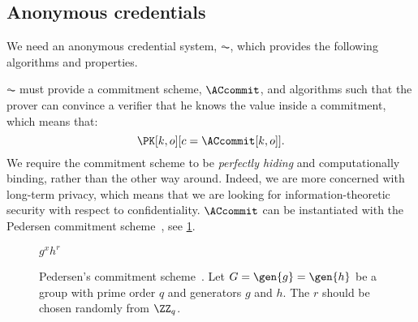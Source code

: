 \subsection{Anonymous credentials}%
\label{ZK-anon-cred}


We need an anonymous credential system, \(\AC\), which provides the following algorithms and properties.

\(\AC\) must provide a commitment scheme, \(\ACcommit\), and algorithms such that the prover can convince a verifier that he knows the value inside a commitment, which means that:
\begin{equation*}
  \PK[k, o][c = \ACcommit[k,o]].
\end{equation*}
We require the commitment scheme to be \emph{perfectly hiding} and computationally binding, rather than the other way around.
Indeed, we are more concerned with long-term privacy, which means that we are looking for information-theoretic security with respect to confidentiality.
\(\ACcommit\) can be instantiated with the Pedersen commitment 
scheme~\cite{PedersenCommitment}, see \cref{ACcommitAlg}.

\begin{figure}
  \small
  \begin{algorithmic}
    \State \Return $g^x h^r$
    \EndFunction
  \end{algorithmic}
  \caption{\label{ACcommitAlg}%
    Pedersen's commitment scheme~\cite{PedersenCommitment}.
    Let \(G = \gen{g} = \gen{h}\) be a group with prime order \(q\) and 
    generators \(g\) and \(h\).%
    The \(r\) should be chosen randomly from \(\ZZ_q\).
  }
\end{figure}

